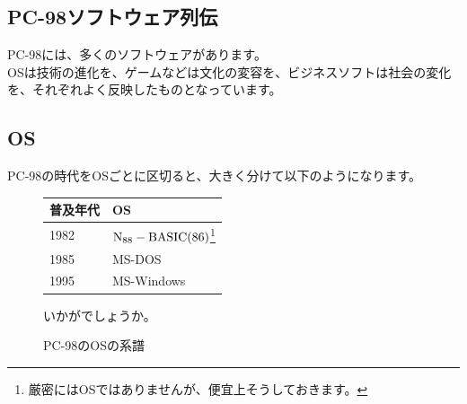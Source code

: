 \documentclass[b5paper,9pt,platex,dvipdfmx]{jsarticle}
\begin{document}
\begin{multicols}{3}
\section[short]{PC-98ソフトウェア列伝}
PC-98には、多くのソフトウェアがあります。\\
OSは技術の進化を、ゲームなどは文化の変容を、ビジネスソフトは社会の変化を、それぞれよく反映したものとなっています。\\
\subsection[short]{OS}
PC-98の時代をOSごとに区切ると、大きく分けて以下のようになります。\\
\begin{figure}[H]
  \centering
  \begin{tabular}{ll}
    普及年代 & OS\\ \hline
    1982 & $\rm{N_{88}-BASIC (86)}$\footnote{厳密にはOSではありませんが、便宜上そうしておきます。}\\
    1985 & MS-DOS\\
    1995 & MS-Windows\\
  \end{tabular}
  \caption{PC-98のOSの系譜}
  いかがでしょうか。\\
\end{figure}
\end{multicols}
\end{document}

